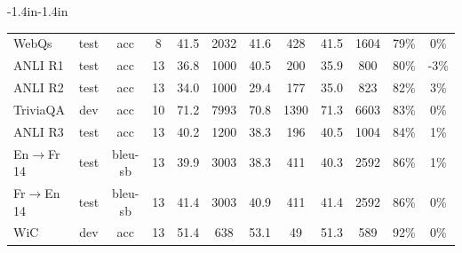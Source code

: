 \documentclass{article}
\begin{document}
\begin{table}
{\begin{adjustwidth}{-1.4in}{-1.4in}
\begin{center}
\begin{tabular}{lccccccccccc}
               WebQs &  test &      acc &   8 &        41.5 &                      2032 &                            41.6 &                       428 &                            41.5 &                      1604 &                            79\% &                                                 0\% \\
             ANLI R1 &  test &      acc &  13 &        36.8 &                      1000 &                            40.5 &                       200 &                            35.9 &                       800 &                            80\% &                                                -3\% \\
             ANLI R2 &  test &      acc &  13 &        34.0 &                      1000 &                            29.4 &                       177 &                            35.0 &                       823 &                            82\% &                                                 3\% \\
            TriviaQA &   dev &      acc &  10 &        71.2 &                      7993 &                            70.8 &                      1390 &                            71.3 &                      6603 &                            83\% &                                                 0\% \\
             ANLI R3 &  test &      acc &  13 &        40.2 &                      1200 &                            38.3 &                       196 &                            40.5 &                      1004 &                            84\% &                                                 1\% \\
        En$\to$Fr 14 &  test &  bleu-sb &  13 &        39.9 &                      3003 &                            38.3 &                       411 &                            40.3 &                      2592 &                            86\% &                                                 1\% \\
        Fr$\to$En 14 &  test &  bleu-sb &  13 &        41.4 &                      3003 &                            40.9 &                       411 &                            41.4 &                      2592 &                            86\% &                                                 0\% \\
                 WiC &   dev &      acc &  13 &        51.4 &                       638 &                            53.1 &                        49 &                            51.3 &                       589 &                            92\% &                                                 0\% \\

\end{tabular}
\end{center}
\end{adjustwidth}}
\end{table}
\end{document}
